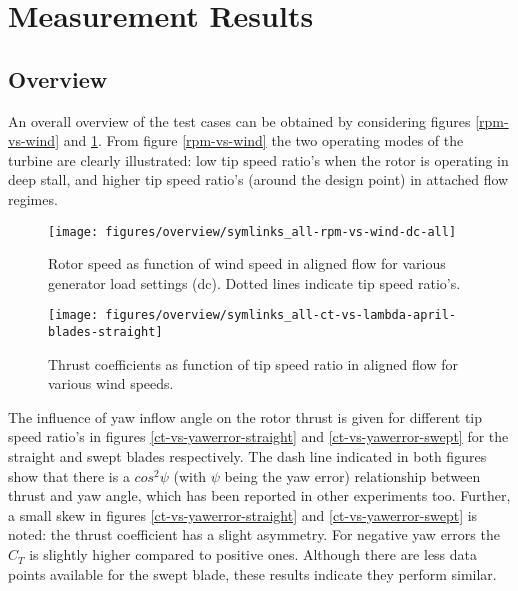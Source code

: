 \documentclass[a4paper]{jpconf}
\begin{document}
\section{Measurement Results}

\subsection{Overview}

An overall overview of the test cases can be obtained by considering figures \ref{rpm-vs-wind} and \ref{ct-vs-lambda}. From figure \ref{rpm-vs-wind} the two operating modes of the turbine are clearly illustrated: low tip speed ratio's when the rotor is operating in deep stall, and higher tip speed ratio's (around the design point) in attached flow regimes. 

\begin{figure}[h]
\begin{minipage}{17pc}
\vspace{10px}
\texttt{[image: figures/overview/symlinks\_all-rpm-vs-wind-dc-all]}
\caption{\label{rpm-vs-wind} Rotor speed as function of wind speed in aligned flow for various generator load settings (dc). Dotted lines indicate tip speed ratio's.}
\end{minipage}\hspace{3pc}%
\begin{minipage}{17pc}
\texttt{[image: figures/overview/symlinks\_all-ct-vs-lambda-april-blades-straight]}
\caption{\label{ct-vs-lambda} Thrust coefficients as function of tip speed ratio in aligned flow for various wind speeds.}
\end{minipage} 
\end{figure}


The influence of yaw inflow angle on the rotor thrust is given for different tip speed ratio's in figures \ref{ct-vs-yawerror-straight} and \ref{ct-vs-yawerror-swept} for the straight and swept blades respectively. The dash line indicated in both figures show that there is a $cos^2 \psi$ (with $\psi$ being the yaw error) relationship between thrust and yaw angle, which has been reported in other experiments too. Further, a small skew in figures \ref{ct-vs-yawerror-straight} and \ref{ct-vs-yawerror-swept} is noted: the thrust coefficient has a slight asymmetry. For negative yaw errors the $C_T$ is slightly higher compared to positive ones. Although there are less data points available for the swept blade, these results indicate they perform similar.
\end{document}
